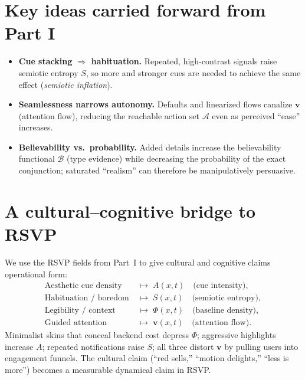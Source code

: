 \documentclass[openany]{book}
\newcommand{\Auton}{\mathcal{A}} %
\begin{document}
\section*{Key ideas carried forward from Part I}
\begin{itemize}
  \item \textbf{Cue stacking $\Rightarrow$ habituation.} Repeated, high-contrast signals raise semiotic entropy $S$, so more and stronger cues are needed to achieve the same effect (\emph{semiotic inflation}).
  \item \textbf{Seamlessness narrows autonomy.} Defaults and linearized flows canalize $\mathbf{v}$ (attention flow), reducing the reachable action set $\Auton$ even as perceived “ease” increases.
  \item \textbf{Believability vs.\ probability.} Added details increase the believability functional $\mathcal{B}$ (type evidence) while decreasing the probability of the exact conjunction; saturated “realism” can therefore be manipulatively persuasive.
\end{itemize}

\section*{A cultural–cognitive bridge to RSVP}
We use the RSVP fields from Part~I to give cultural and cognitive claims operational form:
\begin{align*}
\text{Aesthetic cue density} &\;\mapsto\; A(x,t)\quad\text{(cue intensity)},\\
\text{Habituation / boredom} &\;\mapsto\; S(x,t)\quad\text{(semiotic entropy)},\\
\text{Legibility / context} &\;\mapsto\; \Phi(x,t)\quad\text{(baseline density)},\\
\text{Guided attention} &\;\mapsto\; \mathbf{v}(x,t)\quad\text{(attention flow)}.
\end{align*}
Minimalist skins that conceal backend cost depress $\Phi$; aggressive highlights increase $A$; repeated notifications raise $S$; all three distort $\mathbf{v}$ by pulling users into engagement funnels. The cultural claim (“red sells,” “motion delights,” “less is more”) becomes a measurable dynamical claim in RSVP.
\end{document}
